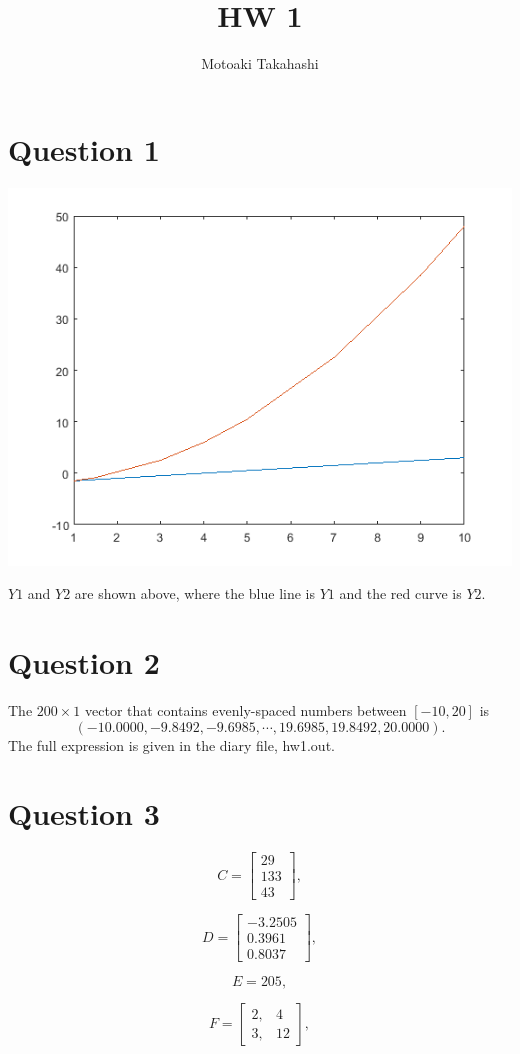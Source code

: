 \documentclass[12pt]{article}
\begin{document}
 
 
\title{HW 1}
\author{Motoaki Takahashi}
\maketitle
\section{Question 1}

\includegraphics{q1.png}\par
$Y1$ and $Y2$ are shown above, where the blue line is $Y1$ and the red curve is $Y2$.

\section{Question 2}
The $200\times1$ vector that contains evenly-spaced numbers between $[-10, 20]$ is 
$$
( -10.0000, -9.8492, -9.6985, \cdots, 19.6985, 19.8492, 20.0000).
$$
The full expression is given in the diary file, hw1.out.

\section{Question 3}
$$
C=\left[
\begin{array}{c}
    29\\
   133\\
43
\end{array}
\right],
$$

$$
D=\left[
\begin{array}{c}
   -3.2505\\
    0.3961\\
0.8037
\end{array}
\right],
$$

$$
E=205,
$$

$$
F=\left[
\begin{array}{cc}
     2, &    4\\
3, & 12
\end{array}
\right],
$$
\end{document}
